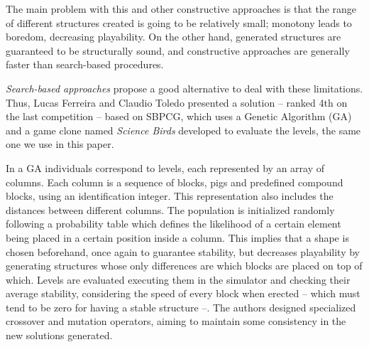 \documentclass[runningheads,a4paper]{llncs}
\begin{document}
The main problem with this and other constructive approaches is that the range of
different structures created is going to be relatively small; monotony
leads to boredom, decreasing playability. On the other hand, generated
structures are guaranteed to be structurally sound, and constructive
approaches are generally faster than search-based procedures.

\textit{Search-based approaches} propose a good alternative to deal
with these limitations. Thus, Lucas Ferreira and Claudio Toledo
\cite{ferreira2014search} presented a solution -- ranked 4th on the
last competition -- based on SBPCG, which uses a Genetic Algorithm
(GA) and a game clone named \textit{Science Birds} developed to
evaluate the levels, the same one we use in this paper.

In a GA individuals correspond to levels, each represented by an array
of columns. Each column is a sequence of blocks, pigs and predefined
compound blocks, using an identification integer. This representation
also includes the distances between different columns. The population
is initialized randomly following a probability table which defines
the likelihood of a certain element being placed in a certain position
inside a column. This implies that a shape is chosen beforehand, once
again to guarantee stability, but decreases playability by generating
structures whose only differences are which blocks are placed on top
of which.  Levels are evaluated executing them in the simulator and
checking their average stability, considering the speed of every block
when erected -- which must tend to be zero for having a stable
structure --. The authors designed specialized crossover and mutation
operators, aiming to maintain some consistency in the new solutions
generated.
\end{document}
